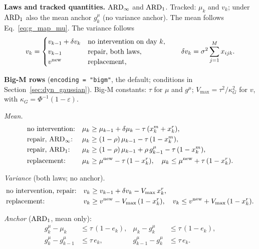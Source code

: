\textbf{Laws and tracked quantities.} $\mathrm{ARD}_{\infty}$ and $\mathrm{ARD}_{1}$. Tracked: $\mu_k$ and
$v_k$; under $\mathrm{ARD}_{1}$ also the mean anchor $g^{\mu}_k$ (no variance anchor). The
mean follows Eq.~\eqref{eq:g_map_mu}. The variance follows
\begin{equation}
  v_k = \begin{cases}
    v_{k-1} + \delta v_k & \text{no intervention on day } k,\\
    v_{k-1} & \text{repair, both laws},\\
    v^{\mathrm{new}} & \text{replacement,}
  \end{cases}
  \qquad \delta v_k = \sigma^2 \sum_{j=1}^{M} x_{ijk}.
  \label{eq:w_map_v}
\end{equation}

\textbf{Big-M rows} (\texttt{encoding = "bigm"}, the default; conditions in
Section~\ref{sec:dyn_gaussian}). Big-M constants: $\tau$ for $\mu$ and $g^{\mu}$;
$V_{\max} = \tau^2/\kappa_G^2$ for $v$, with $\kappa_G = \Phi^{-1}(1-\varepsilon)$.

\emph{Mean.}
\begin{align}
  &\text{no intervention:} & \mu_k &\geq \mu_{k-1} + \delta\mu_k - \tau\,(x^m_k + x^r_k),
    \label{eq:w_mu_carry} \\
  &\text{repair, } \mathrm{ARD}_{\infty}\text{:} & \mu_k &\geq (1-\rho)\,\mu_{k-1} - \tau\,(1 - x^m_k),
    \label{eq:w_mu_inf} \\
  &\text{repair, } \mathrm{ARD}_{1}\text{:} & \mu_k &\geq (1-\rho)\,\mu_{k-1} + \rho\, g^{\mu}_{k-1}
    - \tau\,(1 - x^m_k),
    \label{eq:w_mu_one} \\
  &\text{replacement:} & \mu_k &\geq \mu^{\mathrm{new}} - \tau\,(1 - x^r_k), \quad
    \mu_k \leq \mu^{\mathrm{new}} + \tau\,(1 - x^r_k).
    \label{eq:w_mu_repl}
\end{align}

\emph{Variance} (both laws; no anchor).
\begin{align}
  &\text{no intervention, repair:} & v_k &\geq v_{k-1} + \delta v_k - V_{\max}\, x^r_k,
    \label{eq:w_vrow} \\
  &\text{replacement:} & v_k &\geq v^{\mathrm{new}} - V_{\max}\,(1 - x^r_k), \quad
    v_k \leq v^{\mathrm{new}} + V_{\max}\,(1 - x^r_k).
    \label{eq:w_v_repl}
\end{align}

\emph{Anchor} ($\mathrm{ARD}_{1}$, mean only):
\begin{align}
  g^{\mu}_k - \mu_k &\leq \tau\,(1 - e_k), & \mu_k - g^{\mu}_k &\leq \tau\,(1 - e_k),
    \label{eq:w_anchor_set} \\
  g^{\mu}_k - g^{\mu}_{k-1} &\leq \tau\, e_k, & g^{\mu}_{k-1} - g^{\mu}_k &\leq \tau\, e_k.
    \label{eq:w_anchor_keep}
\end{align}

